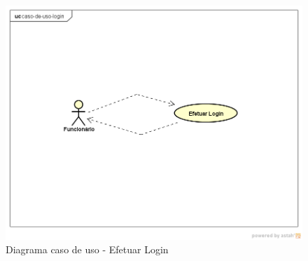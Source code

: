 \begin{figure}[htb]
	\caption{\label{fig_login} Diagrama caso de uso - Efetuar Login}
	\begin{center}
	    \includegraphics[width=0.7\linewidth]{imagens/caso-de-uso-login.png}
	\end{center}
\end{figure}

\newpage

